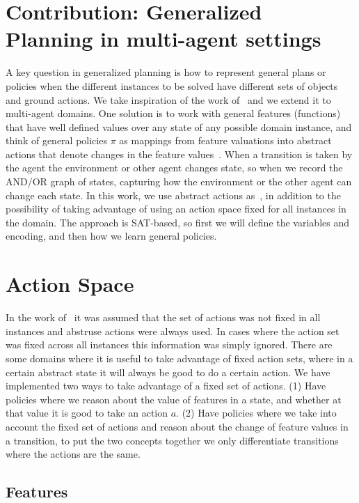 \documentclass[a4paper]{article}
\begin{document}
\section{Contribution: Generalized Planning in multi-agent settings}

A key question in generalized planning is how to represent general plans or policies when the different instances to be solved have different sets of objects and ground actions. We take inspiration of the work of~\cite{frances2021learning} and we extend it to multi-agent domains. One solution is to work with general features (functions) that have well defined values over any state of any possible domain instance, and think of general policies $\pi$ as mappings from feature valuations into abstract actions that denote changes in the feature values~\cite{bandres2018planning}. When a transition is taken by the agent the environment or other agent changes state, so when we record the AND/OR graph of states, capturing how the environment or the other agent can change each state. In this work, we use abstract actions as~\cite{frances2021learning}, in addition to the possibility of taking advantage of using an action space fixed for all instances in the domain.  The approach is SAT-based, so first we will define the variables and encoding, and then how we learn general policies.


\section{Action Space}

In the work of~\cite{frances2021learning} it was assumed that the set of actions was not fixed in all instances and abstruse actions were always used. In cases where the action set was fixed across all instances this information was simply ignored. There are some domains where it is useful to take advantage of fixed action sets, where in a certain abstract state it will always be good to do a certain action. We have implemented two ways to take advantage of a fixed set of actions. (1) Have policies where we reason about the value of features in a state, and whether at that value it is good to take an action $a$. (2) Have policies where we take into account the fixed set of actions and reason about the change of feature values in a transition, to put the two concepts together we only differentiate transitions where the actions are the same.


\subsection{Features}
\end{document}
